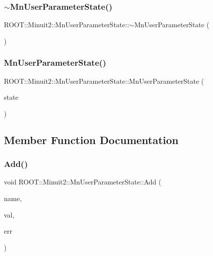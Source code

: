 \subsubsection{\texorpdfstring{$\sim$MnUserParameterState()}{~MnUserParameterState()}\hspace{0.1cm}{\footnotesize\ttfamily [2/2]}}
{\footnotesize\ttfamily R\+O\+O\+T\+::\+Minuit2\+::\+Mn\+User\+Parameter\+State\+::$\sim$\+Mn\+User\+Parameter\+State (\begin{DoxyParamCaption}{ }\end{DoxyParamCaption})\hspace{0.3cm}{\ttfamily [inline]}}

\mbox{\label{classROOT_1_1Minuit2_1_1MnUserParameterState_aee3f88d39b420cc5451d862ac6b543fe}} 
\subsubsection{\texorpdfstring{MnUserParameterState()}{MnUserParameterState()}\hspace{0.1cm}{\footnotesize\ttfamily [16/16]}}
{\footnotesize\ttfamily R\+O\+O\+T\+::\+Minuit2\+::\+Mn\+User\+Parameter\+State\+::\+Mn\+User\+Parameter\+State (\begin{DoxyParamCaption}\item[{const \mbox{\hyperlink{classROOT_1_1Minuit2_1_1MnUserParameterState}{Mn\+User\+Parameter\+State}} \&}]{state }\end{DoxyParamCaption})\hspace{0.3cm}{\ttfamily [inline]}}



\subsection{Member Function Documentation}
\mbox{\label{classROOT_1_1Minuit2_1_1MnUserParameterState_a958abf8c6542ba9be16e298ad2b63001}} 
\subsubsection{\texorpdfstring{Add()}{Add()}\hspace{0.1cm}{\footnotesize\ttfamily [1/6]}}
{\footnotesize\ttfamily void R\+O\+O\+T\+::\+Minuit2\+::\+Mn\+User\+Parameter\+State\+::\+Add (\begin{DoxyParamCaption}\item[{const std\+::string \&}]{name,  }\item[{double}]{val,  }\item[{double}]{err }\end{DoxyParamCaption})}

